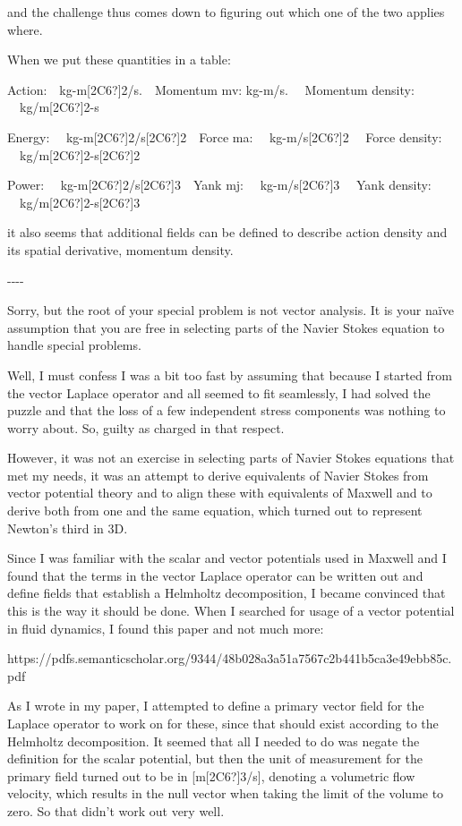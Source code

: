 \documentclass{article}
\begin{document}
and the challenge thus comes down to figuring out which one of the two applies where.

When we put these quantities in a table:

Action:\ \ kg-m[2C6?]2/s.\ \ Momentum mv: kg-m/s.  \ \ Momentum density: \ \ kg/m[2C6?]2-s 

Energy: \ \ kg-m[2C6?]2/s[2C6?]2\ \ Force  ma: \ \   kg-m/s[2C6?]2  \ \ Force density:  \ \ kg/m[2C6?]2-s[2C6?]2\ \ 

Power:  \ \ kg-m[2C6?]2/s[2C6?]3\ \ Yank  mj: \ \   kg-m/s[2C6?]3  \ \ Yank density:  \ \ kg/m[2C6?]2-s[2C6?]3

it also seems that additional fields can be defined to describe action density and its spatial derivative, momentum
density.

{}-{}-{}-{}-

{\textquotedbl}Sorry, but the root of your special problem is not vector analysis. It is your na\"ive assumption that
you are free in selecting parts of the Navier Stokes equation to handle special problems.{\textquotedbl}

Well, I must confess I was a bit too fast by assuming that because I started from the vector Laplace operator and all
seemed to fit seamlessly, I had solved the puzzle and that the loss of a few independent stress components was nothing
to worry about. So, guilty as charged in that respect.  

However, it was not an exercise in selecting parts of Navier Stokes equations that met my needs, it was an attempt to
derive equivalents of Navier Stokes from vector potential theory and to align these with equivalents of Maxwell and to
derive both from one and the same equation, which turned out to represent Newton's third in 3D.

Since I was familiar with the scalar and vector potentials used in Maxwell and I found that the terms in the vector
Laplace operator can be written out and define fields that establish a Helmholtz decomposition, I became convinced that
this is the way it should be done. When I searched for usage of a vector potential in fluid dynamics, I found this
paper and not much more: 

https://pdfs.semanticscholar.org/9344/48b028a3a51a7567c2b441b5ca3e49ebb85c.pdf 

As I wrote in my paper, I attempted to define a primary vector field for the Laplace operator to work on for these,
since that should exist according to the Helmholtz decomposition. It seemed that all I needed to do was negate the
definition for the scalar potential, but then the unit of measurement for the primary field turned out to be in
[m[2C6?]3/s], denoting a volumetric flow velocity, which results in the null vector when taking the limit of the volume
to zero. So that didn't work out very well.
\end{document}
